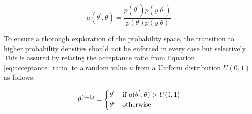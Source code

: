         \begin{equation}\label{eq:acceptance_ratio}
        a(\theta^{'},\theta)=\frac{p(\theta^{'})p(y|\theta^{'})}{p(\theta)p(y|\theta)}
        \end{equation}
        
        To ensure a thorough exploration of the probability space, the transition to higher probability densities should not be enforced in every case but selectively. This is assured by relating the acceptance ratio from Equation \ref{eq:acceptance_ratio} to a random value $u$ from a Uniform distribution $U(0,1)$ as follows:
        
        \begin{equation}\label{eq:transition_selectivity}
        \theta^{(t+1)}=\begin{cases}
        \theta^{'} & $if $ a(\theta^{'},\theta)>U(0,1)\\
        \theta^{t} & $otherwise$\\
        \end{cases}
        \end{equation}
        
